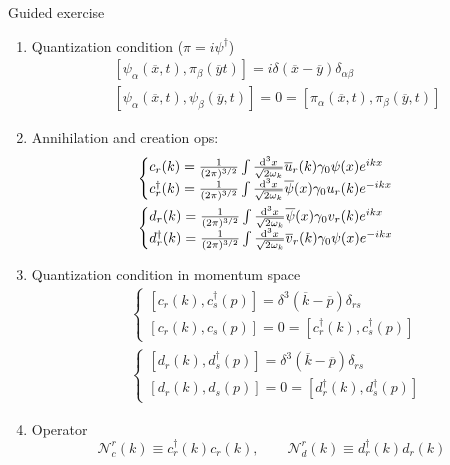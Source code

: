 \begin{example}
Guided exercise
\begin{enumerate}
\item Quantization condition ($\pi=i\psi^\dagger$)
\begin{align*}
& \left[\psi_\alpha(\overline{x},t), \pi_\beta(\overline{y}t)\right] = i\delta(\overline{x}- \overline{y})\delta_{\alpha\beta}\\
& \left[\psi_\alpha(\overline{x},t),\psi_\beta(\overline{y},t)\right] = 0 = \left[\pi_\alpha(\overline{x},t), \pi_\beta(\overline{y},t)\right]
\end{align*}
\item Annihilation and creation ops:
\begin{align*}
& \begin{cases}
c_r(k) = \frac{1}{(2\pi)^{3/2}}\int \frac{\operatorname{d \!}{^3x}}{\sqrt{2\omega_k}}\overline{u}_r(k)\gamma_0\psi(x)e^{ikx} \\
c^\dagger_r(k) = \frac{1}{(2\pi)^{3/2}}\int \frac{\operatorname{d \!}{^3x}}{\sqrt{2\omega_k}}\overline{\psi}(x)\gamma_0u_r(k)e^{-ikx}
\end{cases} \\
& \begin{cases}
d_r(k) = \frac{1}{(2\pi)^{3/2}}\int \frac{\operatorname{d \!}{^3x}}{\sqrt{2\omega_k}}\overline{\psi}(x)\gamma_0v_r(k)e^{ikx} \\
d^\dagger_r(k) = \frac{1}{(2\pi)^{3/2}}\int \frac{\operatorname{d \!}{^3x}}{\sqrt{2\omega_k}}\overline{v}_r(k)\gamma_0\psi(x)e^{-ikx}
\end{cases}
\end{align*}
\item Quantization condition in momentum space
\begin{align*}
& \begin{cases}
\left[c_r(k), c^\dagger_s(p)\right] = \delta^3(\overline{k}- \overline{p})\delta_{rs}\\
\left[c_r(k), c_s(p)\right] = 0 = \left[c_r^\dagger(k), c_s^\dagger(p)\right]
\end{cases} \\
& \begin{cases}
\left[d_r(k), d^\dagger_s(p)\right] = \delta^3(\overline{k}- \overline{p})\delta_{rs}\\
\left[d_r(k), d_s(p)\right] = 0 = \left[d_r^\dagger(k), d_s^\dagger(p)\right]
\end{cases}
\end{align*}
\item Operator
\[ \mathcal{N}_{c}^{r}(k) \equiv c_r^\dagger(k)c_r(k), \qquad \mathcal{N}_d^{r}(k) \equiv d_r^\dagger(k)d_r(k) \]

\end{enumerate}
\end{example}
